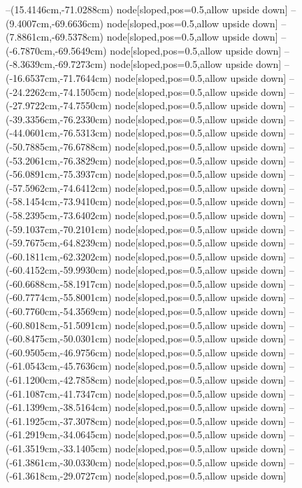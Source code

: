 --(15.4146cm,-71.0288cm) node[sloped,pos=0.5,allow upside down]{\ArrowIn}
--(9.4007cm,-69.6636cm) node[sloped,pos=0.5,allow upside down]{\ArrowIn}
--(7.8861cm,-69.5378cm) node[sloped,pos=0.5,allow upside down]{\ArrowIn}
--(-6.7870cm,-69.5649cm) node[sloped,pos=0.5,allow upside down]{\ArrowIn}
--(-8.3639cm,-69.7273cm) node[sloped,pos=0.5,allow upside down]{\ArrowIn}
--(-16.6537cm,-71.7644cm) node[sloped,pos=0.5,allow upside down]{\ArrowIn}
--(-24.2262cm,-74.1505cm) node[sloped,pos=0.5,allow upside down]{\ArrowIn}
--(-27.9722cm,-74.7550cm) node[sloped,pos=0.5,allow upside down]{\ArrowIn}
--(-39.3356cm,-76.2330cm) node[sloped,pos=0.5,allow upside down]{\ArrowIn}
--(-44.0601cm,-76.5313cm) node[sloped,pos=0.5,allow upside down]{\ArrowIn}
--(-50.7885cm,-76.6788cm) node[sloped,pos=0.5,allow upside down]{\ArrowIn}
--(-53.2061cm,-76.3829cm) node[sloped,pos=0.5,allow upside down]{\ArrowIn}
--(-56.0891cm,-75.3937cm) node[sloped,pos=0.5,allow upside down]{\ArrowIn}
--(-57.5962cm,-74.6412cm) node[sloped,pos=0.5,allow upside down]{\ArrowIn}
--(-58.1454cm,-73.9410cm) node[sloped,pos=0.5,allow upside down]{\arrowIn}
--(-58.2395cm,-73.6402cm) node[sloped,pos=0.5,allow upside down]{\arrowIn}
--(-59.1037cm,-70.2101cm) node[sloped,pos=0.5,allow upside down]{\ArrowIn}
--(-59.7675cm,-64.8239cm) node[sloped,pos=0.5,allow upside down]{\ArrowIn}
--(-60.1811cm,-62.3202cm) node[sloped,pos=0.5,allow upside down]{\ArrowIn}
--(-60.4152cm,-59.9930cm) node[sloped,pos=0.5,allow upside down]{\ArrowIn}
--(-60.6688cm,-58.1917cm) node[sloped,pos=0.5,allow upside down]{\ArrowIn}
--(-60.7774cm,-55.8001cm) node[sloped,pos=0.5,allow upside down]{\ArrowIn}
--(-60.7760cm,-54.3569cm) node[sloped,pos=0.5,allow upside down]{\ArrowIn}
--(-60.8018cm,-51.5091cm) node[sloped,pos=0.5,allow upside down]{\ArrowIn}
--(-60.8475cm,-50.0301cm) node[sloped,pos=0.5,allow upside down]{\ArrowIn}
--(-60.9505cm,-46.9756cm) node[sloped,pos=0.5,allow upside down]{\ArrowIn}
--(-61.0543cm,-45.7636cm) node[sloped,pos=0.5,allow upside down]{\ArrowIn}
--(-61.1200cm,-42.7858cm) node[sloped,pos=0.5,allow upside down]{\ArrowIn}
--(-61.1087cm,-41.7347cm) node[sloped,pos=0.5,allow upside down]{\ArrowIn}
--(-61.1399cm,-38.5164cm) node[sloped,pos=0.5,allow upside down]{\ArrowIn}
--(-61.1925cm,-37.3078cm) node[sloped,pos=0.5,allow upside down]{\ArrowIn}
--(-61.2919cm,-34.0645cm) node[sloped,pos=0.5,allow upside down]{\ArrowIn}
--(-61.3519cm,-33.1405cm) node[sloped,pos=0.5,allow upside down]{\arrowIn}
--(-61.3861cm,-30.0330cm) node[sloped,pos=0.5,allow upside down]{\ArrowIn}
--(-61.3618cm,-29.0727cm) node[sloped,pos=0.5,allow upside down]{\arrowIn}
